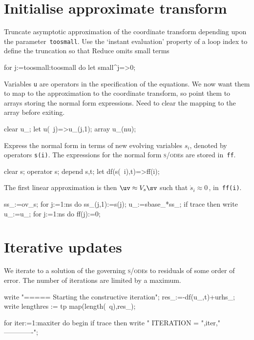 \documentclass[11pt,a5paper]{article}
\def\sde{\textsc{s/ode}}
\begin{document}
\section{Initialise approximate transform}

Truncate asymptotic approximation of the coordinate
transform depending upon the parameter~\verb|toosmall|. Use
the `instant evaluation' property of a loop index to define
the truncation so that Reduce omits small terms 
\begin{reduce}
for j:=toosmall:toosmall do let small^j=>0;
\end{reduce}

Variables \verb|u| are operators in
the specification of the equations. We now want them to map
to the approximation to the coordinate transform, so point
them to arrays storing the normal form expressions.  Need to
clear the mapping to the array before exiting.
\begin{reduce}
clear u_;
let u(~j)=>u_(j,1);
array u_(nu);
\end{reduce}

Express the normal form in terms of new evolving variables
$s_i$, denoted by operators \verb|s(i)|. The expressions for
the normal form \sde{}s are stored in~\verb|ff|.
\begin{reduce}
clear s;
operator s;
depend s,t;
let df(s(~i),t)=>ff(i);
\end{reduce}

The first linear approximation is then $\uv \approx V_s\sv$
such that $\dot s_i \approx 0$\,, in~\verb|ff(i)|. 
\begin{reduce}
ss_:=ov_s;
for j:=1:ns do ss_(j,1):=s(j);
u_:=sbase_*ss_;
if trace then write u_:=u_;
for j:=1:ns do ff(j):=0;
\end{reduce}





\section{Iterative updates}

We iterate to a solution of the governing \sde{}s to
residuals of some order of error. The number of iterations
are limited by a maximum.
\begin{reduce}
write "===== Starting the constructive iteration";
res_:=-df(u_,t)+urhs_;
write lengthres := tp map(length(~q),res_);

for iter:=1:maxiter do begin
  if trace then write "
  ITERATION = ",iter,"
  -------------";
\end{reduce}
\end{document}
